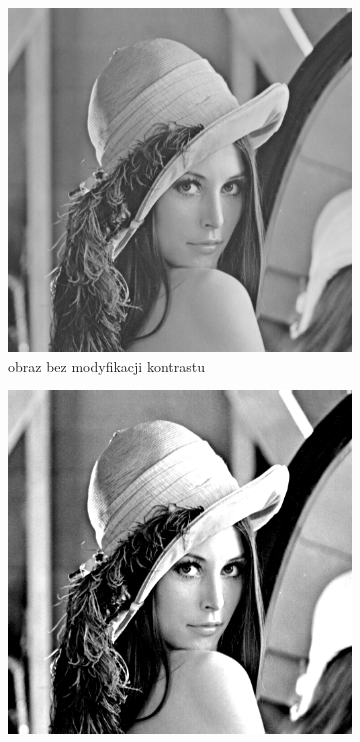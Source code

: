         \begin{figure}[H] 
            \centering
            \begin{subfigure}{0.49\textwidth}
                \centering
                \includegraphics[width = \textwidth]{img/2-theory/lenna10.png}
                \caption{obraz bez modyfikacji kontrastu}
                \label{theory-contrast-lenna-a}
            \end{subfigure}
            \begin{subfigure}{0.49\textwidth}
                \centering
                \includegraphics[width = \textwidth]{img/2-theory/lenna20.png}

\end{subfigure}
\end{figure}
